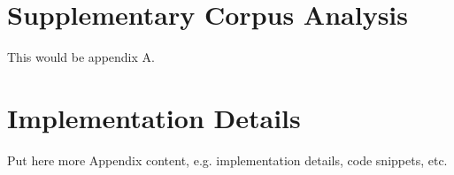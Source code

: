 \documentclass[fontsize=11pt,BCOR=5mm,DIV=12,parskip=half,listof=totoc, paper=a4,toc=bibliography,numbers=noenddot]{scrreprt}
\begin{document}
\appendix
\ihead{}

\chapter{Supplementary Corpus Analysis}
\label{app:corpus}

% 

This would be appendix A.


\chapter{Implementation Details}
\label{app:implementation}

% 

Put here more Appendix content, e.g. implementation details, code snippets, etc.



\nocite{*}

\initializeBibliography





\cleardoublepage
\end{document}
